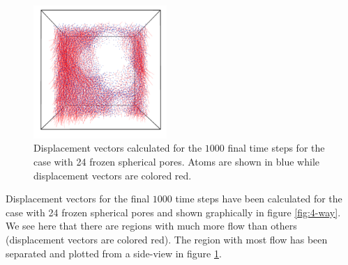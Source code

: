 \documentclass[reprint,floatfix,amsmath,amssymb,aps,pra]{revtex4-1}
\begin{document}
\begin{figure}
  \centering
  \includegraphics[width=0.45\textwidth]{../analysis/1k-permeability/runs/2013-04-05_201140/frozenpores24/side-view.png}
  \caption{Displacement vectors calculated for the $1000$ final time steps for the case with 24 frozen spherical pores. Atoms are shown in blue while displacement vectors are colored red.}
  \label{fig:side-view}
\end{figure}

Displacement vectors for the final $1000$ time steps have been calculated for the case with 24 frozen spherical pores and shown graphically in figure \ref{fig:4-way}. We see here that there are regions with much more flow than others (displacement vectors are colored red). The region with most flow has been separated and plotted from a side-view in figure \ref{fig:side-view}.
\end{document}
